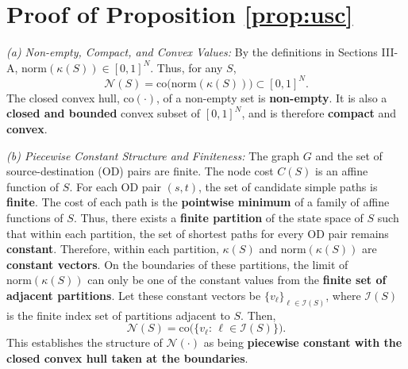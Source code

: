 \documentclass[journal]{IEEEtran}
\begin{document}
\section{Proof of Proposition \ref{prop:usc}}
\label{app:proof_prop_usc}
\begin{IEEEproof}
\textit{(a) Non-empty, Compact, and Convex Values:}
By the definitions in Sections III-A, $\mathrm{norm}(\kappa(S))\in[0,1]^N$. Thus, for any $S$,
\begin{equation}
\mathcal N(S)=\mathrm{co}\!\big(\mathrm{norm}(\kappa(S))\big)\subset[0,1]^N.
\end{equation}
The closed convex hull, $\mathrm{co}(\cdot)$, of a non-empty set is \textbf{non-empty}. It is also a \textbf{closed and bounded} convex subset of $[0,1]^N$, and is therefore \textbf{compact} and \textbf{convex}.

\textit{(b) Piecewise Constant Structure and Finiteness:}
The graph $G$ and the set of source-destination (OD) pairs are finite. The node cost $C(S)$ is an affine function of $S$. For each OD pair $(s,t)$, the set of candidate simple paths is \textbf{finite}. The cost of each path is the \textbf{pointwise minimum} of a family of affine functions of $S$. Thus, there exists a \textbf{finite partition} of the state space of $S$ such that within each partition, the set of shortest paths for every OD pair remains \textbf{constant}. Therefore, within each partition, $\kappa(S)$ and $\mathrm{norm}(\kappa(S))$ are \textbf{constant vectors}. On the boundaries of these partitions, the limit of $\mathrm{norm}(\kappa(S))$ can only be one of the constant values from the \textbf{finite set of adjacent partitions}. Let these constant vectors be $\{v_\ell\}_{\ell\in\mathcal I(S)}$, where $\mathcal I(S)$ is the finite index set of partitions adjacent to $S$. Then,
\begin{equation}
\mathcal N(S)=\mathrm{co}\big(\{v_\ell:\,\ell\in\mathcal I(S)\}\big).
\end{equation}
This establishes the structure of $\mathcal N(\cdot)$ as being \textbf{piecewise constant with the closed convex hull taken at the boundaries}.


\end{IEEEproof}
\end{document}
